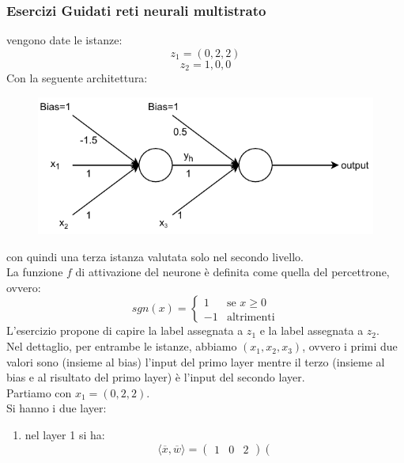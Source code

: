 						 	\subsubsection{Esercizi Guidati reti neurali multistrato}
							\begin{esercizio}
								vengono date le istanze:
								\[z_1=(0, 2, 2)\]
								\[z_2=1, 0, 0\]
								Con la seguente architettura:
								\begin{figure}[H]
									\centering
									\includegraphics[scale = 0.9]{img/per2.pdf}
								\end{figure}
								con quindi una terza istanza valutata solo nel secondo livello.\\
								La funzione $f$ di attivazione del neurone è definita come quella del
								percettrone, ovvero:
								\[sgn(x)=
									\begin{cases}
										1  & \mbox{se } x\geq 0 \\
										-1 & \mbox{altrimenti}  
									\end{cases}
								\]
								L'esercizio propone di capire la label assegnata a $z_1$ e la label assegnata
								a $z_2$.\\
								Nel dettaglio, per entrambe le istanze, abbiamo $(x_1, x_2, x_3)$, ovvero i
								primi due valori sono (insieme al bias) l'input del primo layer mentre il
								terzo (insieme al bias e al risultato del primo layer) è l'input del secondo
								layer.\\
								Partiamo con $x_1=(0, 2, 2)$.\\
								Si hanno i due layer:
								\begin{enumerate}
									\item nel layer 1 si ha:
									      \[\langle \overline{x},\overline{w}\rangle=
									      	\left(\begin{matrix}
									      	1 & 0 & 2
									      	\end{matrix}\right)
									      	\left(
\]
\end{enumerate}
\end{esercizio}

